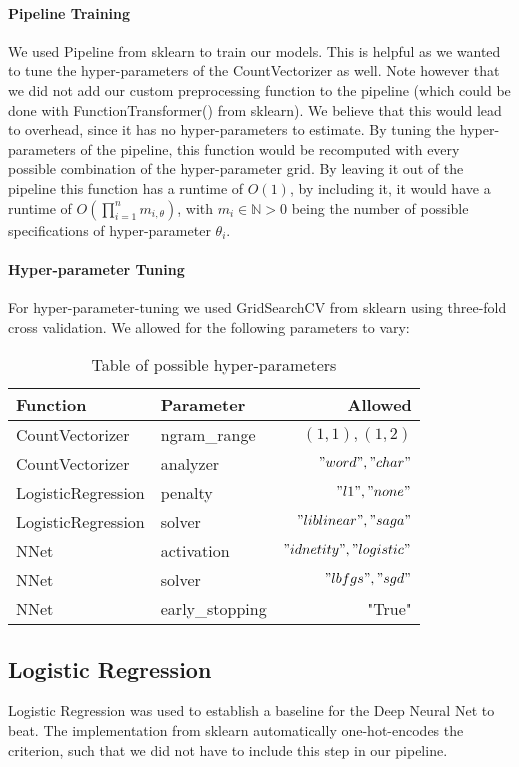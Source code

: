 \documentclass[fleqn,10pt]{SelfArx} %
\begin{document}
\paragraph{Pipeline Training} We used Pipeline from sklearn to train our models. This is helpful as we wanted to tune the hyper-parameters of the CountVectorizer as well. Note however that we did not add our custom preprocessing function to the pipeline (which could be done with FunctionTransformer() from sklearn). We believe that this would lead to overhead, since it has no hyper-parameters to estimate. By tuning the hyper-parameters of the pipeline, this function would be recomputed with every possible combination of the hyper-parameter grid. By leaving it out of the pipeline this function has a runtime of $O(1)$, by including it, it would have a runtime of $O(\prod\limits_{i = 1}^{n} m_{i,\theta})$, with $ m_i \in \mathbb{N} > 0$ being the number of possible specifications of hyper-parameter $\theta_i$.

\paragraph{Hyper-parameter Tuning}For hyper-parameter-tuning we used GridSearchCV from sklearn using three-fold cross validation. We allowed for the following parameters to vary:
\begin{table}[hbt]
	\caption{Table of possible hyper-parameters}
	\centering
	\begin{tabular}{llr}
		\toprule
		 Function & Parameter & Allowed \\
		\midrule
		CountVectorizer & ngram\_range & $(1,1), (1,2)$ \\
		CountVectorizer & analyzer & $"word", "char"$ \\
		LogisticRegression & penalty & $"l1", "none"$ \\
		LogisticRegression & solver & $"liblinear", "saga"$ \\
		NNet & activation & $"idnetity", "logistic"$\\
		NNet & solver & $"lbfgs", "sgd"$ \\
		NNet & early\_stopping & "True"\\
		\bottomrule
	\end{tabular}
	\label{tab:label}
\end{table}


\subsection{Logistic Regression}
Logistic Regression was used to establish a baseline for the Deep Neural Net to beat. The implementation from sklearn automatically one-hot-encodes the criterion, such that we did not have to include this step in our pipeline.
\end{document}
